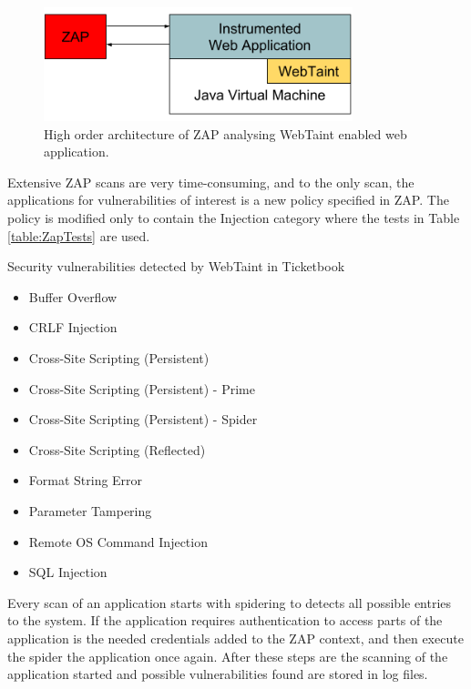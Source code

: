 \begin{figure}[H]
    \centering
    \includegraphics[width=0.8\textwidth]{images/ZAPArchitecture.png}
    \caption{High order architecture of ZAP analysing WebTaint enabled web application.}
    \label{fig:ZAP}
\end{figure}

Extensive ZAP scans are very time-consuming, and to the only scan, the applications for vulnerabilities of interest is a new policy specified in ZAP. The policy is modified only to contain the Injection category where the tests in Table \ref{table:ZapTests} are used.

\begin{table}[H]
  \centering
  \caption{Security vulnerabilities detected by WebTaint in Ticketbook}
    \label{table:ZapTests}
    \begin{itemize}
        \item Buffer Overflow
        \item CRLF Injection
        \item Cross-Site Scripting (Persistent)
        \item Cross-Site Scripting (Persistent) - Prime
        \item Cross-Site Scripting (Persistent) - Spider
        \item Cross-Site Scripting (Reflected)
        \item Format String Error
        \item Parameter Tampering
        \item Remote OS Command Injection
        \item SQL Injection
    \end{itemize}
\end{table}

Every scan of an application starts with spidering to detects all possible entries to the system. If the application requires authentication to access parts of the application is the needed credentials added to the ZAP context, and then execute the spider the application once again. After these steps are the scanning of the application started and possible vulnerabilities found are stored in log files.

